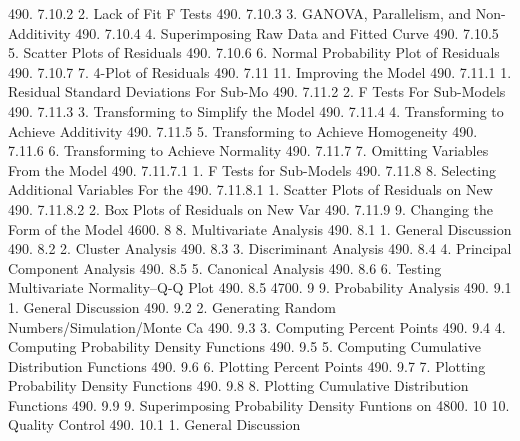 490.      7.10.2                      2. Lack of Fit F Tests
490.      7.10.3                      3. GANOVA, Parallelism, and Non-Additivity
490.      7.10.4                      4. Superimposing Raw Data and Fitted Curve
490.      7.10.5                      5. Scatter Plots of Residuals
490.      7.10.6                      6. Normal Probability Plot of Residuals
490.      7.10.7                      7. 4-Plot of Residuals
490.      7.11                 11. Improving the Model
490.      7.11.1                      1. Residual Standard Deviations For Sub-Mo
490.      7.11.2                      2. F Tests For Sub-Models
490.      7.11.3                      3. Transforming to Simplify the Model
490.      7.11.4                      4. Transforming to Achieve Additivity
490.      7.11.5                      5. Transforming to Achieve Homogeneity
490.      7.11.6                      6. Transforming to Achieve Normality
490.      7.11.7                      7. Omitting Variables From the Model
490.      7.11.7.1                          1. F Tests for Sub-Models
490.      7.11.8                      8. Selecting Additional Variables For the
490.      7.11.8.1                          1. Scatter Plots of Residuals on New
490.      7.11.8.2                          2. Box Plots of Residuals on New Var
490.      7.11.9                      9. Changing the Form of the Model
4600.     8               8. Multivariate Analysis
490.      8.1                   1. General Discussion
490.      8.2                   2. Cluster Analysis
490.      8.3                   3. Discriminant Analysis
490.      8.4                   4. Principal Component Analysis
490.      8.5                   5. Canonical Analysis
490.      8.6                   6. Testing Multivariate Normality--Q-Q Plot
490.      8.5
4700.     9               9. Probability Analysis
490.      9.1                   1. General Discussion
490.      9.2                   2. Generating Random Numbers/Simulation/Monte Ca
490.      9.3                   3. Computing Percent Points
490.      9.4                   4. Computing Probability Density Functions
490.      9.5                   5. Computing Cumulative Distribution Functions
490.      9.6                   6. Plotting Percent Points
490.      9.7                   7. Plotting Probability Density Functions
490.      9.8                   8. Plotting Cumulative Distribution Functions
490.      9.9                   9. Superimposing Probability Density Funtions on
4800.     10             10. Quality Control
490.      10.1                  1. General Discussion
